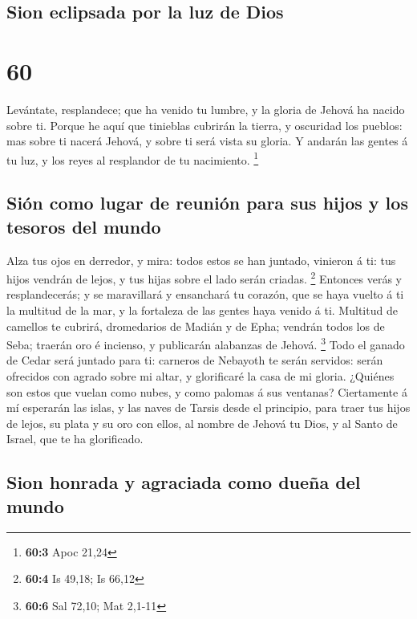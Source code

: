 \hypertarget{sion-eclipsada-por-la-luz-de-dios}{%
\subsection{Sion eclipsada por la luz de
Dios}\label{sion-eclipsada-por-la-luz-de-dios}}

\hypertarget{section-59}{%
\section{60}\label{section-59}}

 Levántate, resplandece; que ha venido tu lumbre, y la
gloria de Jehová ha nacido sobre ti.  Porque he aquí que
tinieblas cubrirán la tierra, y oscuridad los pueblos: mas sobre ti
nacerá Jehová, y sobre ti será vista su gloria.  Y andarán
las gentes á tu luz, y los reyes al resplandor de tu nacimiento.
\footnote{\textbf{60:3} Apoc 21,24}

\hypertarget{siuxf3n-como-lugar-de-reuniuxf3n-para-sus-hijos-y-los-tesoros-del-mundo}{%
\subsection{Sión como lugar de reunión para sus hijos y los tesoros del
mundo}\label{siuxf3n-como-lugar-de-reuniuxf3n-para-sus-hijos-y-los-tesoros-del-mundo}}

 Alza tus ojos en derredor, y mira: todos estos se han
juntado, vinieron á ti: tus hijos vendrán de lejos, y tus hijas sobre el
lado serán criadas. \footnote{\textbf{60:4} Is 49,18; Is 66,12}
 Entonces verás y resplandecerás; y se maravillará y
ensanchará tu corazón, que se haya vuelto á ti la multitud de la mar, y
la fortaleza de las gentes haya venido á ti.  Multitud de
camellos te cubrirá, dromedarios de Madián y de Epha; vendrán todos los
de Seba; traerán oro é incienso, y publicarán alabanzas de Jehová.
\footnote{\textbf{60:6} Sal 72,10; Mat 2,1-11}  Todo el
ganado de Cedar será juntado para ti: carneros de Nebayoth te serán
servidos: serán ofrecidos con agrado sobre mi altar, y glorificaré la
casa de mi gloria.  ¿Quiénes son estos que vuelan como
nubes, y como palomas á sus ventanas?  Ciertamente á mí
esperarán las islas, y las naves de Tarsis desde el principio, para
traer tus hijos de lejos, su plata y su oro con ellos, al nombre de
Jehová tu Dios, y al Santo de Israel, que te ha glorificado.

\hypertarget{sion-honrada-y-agraciada-como-dueuxf1a-del-mundo}{%
\subsection{Sion honrada y agraciada como dueña del
mundo}\label{sion-honrada-y-agraciada-como-dueuxf1a-del-mundo}}

